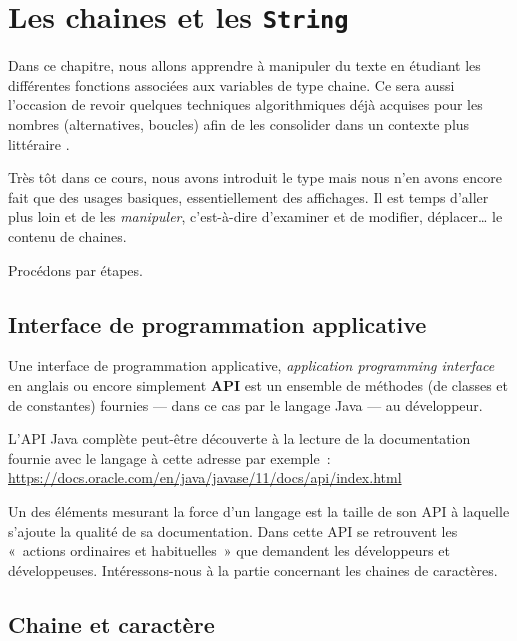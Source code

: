 \chapter{Les chaines et les \texttt{String}}

	Dans ce chapitre, nous allons apprendre à manipuler du texte en étudiant les
	différentes fonctions associées aux variables de type chaine.  Ce sera aussi
	l’occasion de revoir quelques techniques algorithmiques déjà acquises pour
	les nombres (alternatives, boucles) afin de les consolider dans un contexte
	plus \og littéraire \fg.

	
	Très tôt dans ce cours, nous avons introduit le type  mais nous
	n’en avons encore fait que des usages basiques, essentiellement des
	affichages.  Il est temps d’aller plus loin et de les \emph{manipuler},
	c’est-à-dire d’examiner et de modifier, déplacer… le contenu de chaines.
	
	Procédons par étapes.
	
	\minitoc

	\clearpage


\section{Interface de programmation applicative}

Une interface de programmation applicative, \textit{application programming
interface} en anglais ou encore simplement \textbf{API} est un ensemble de
méthodes (de classes et de constantes) fournies — dans ce cas par le langage
Java — au développeur.

L'API Java complète peut-être découverte à la lecture de la documentation
fournie avec le langage à cette adresse par exemple~:
\url{https://docs.oracle.com/en/java/javase/11/docs/api/index.html}~\cite{javadoc}

Un des éléments mesurant la force d'un langage est la taille de son API
à laquelle s'ajoute la qualité de sa documentation. Dans cette API se
retrouvent les «~actions ordinaires et habituelles~» que demandent les
développeurs et développeuses. Intéressons-nous à la partie concernant les
chaines de caractères. 

\section{Chaine et caractère}

